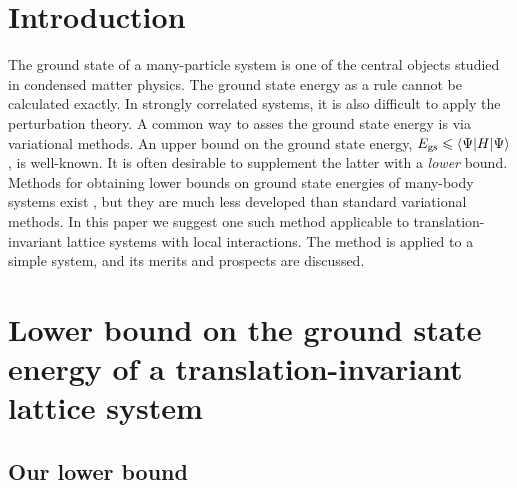 \documentclass[a4paper]{jpconf}
\renewcommand\[{\begin{equation}}
\renewcommand\]{\end{equation}}
\begin{document}
\section{Introduction}
The ground state of a many-particle system is one of the central objects studied in condensed matter physics.
The ground state energy as a rule cannot be calculated exactly.
In strongly correlated systems, it is also difficult to apply the perturbation theory. A common way to asses the ground state energy is via variational methods. An upper bound on the ground state energy, $E_{\rm gs} \leqslant \langle \Psi|H| \Psi \rangle$, is well-known.
It is often desirable to supplement the latter with a {\it lower} bound.
Methods for obtaining lower bounds on ground state energies of many-body systems exist \cite{Anderson,NishimoriOzeki,MattisPan,Mazziotti,Baumgratz}, but they are much less developed than standard variational methods.
In this paper we suggest  one such method applicable to translation-invariant lattice systems with local interactions. The method is applied to a simple system, and its merits and prospects are discussed.

\section{Lower bound on the ground state energy of a translation-invariant lattice system}

\subsection{Our lower bound}
\end{document}
